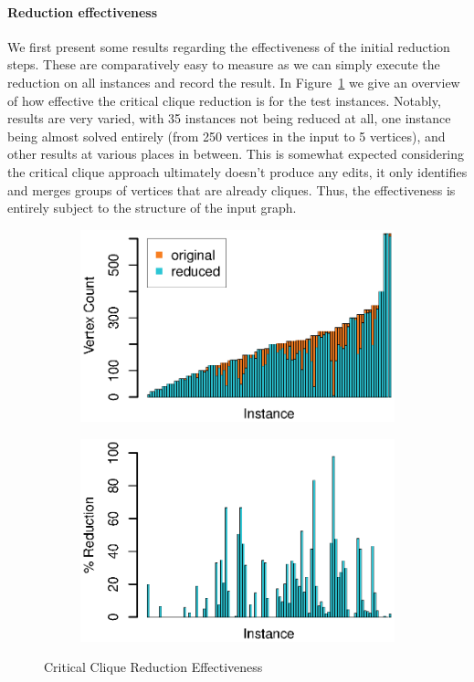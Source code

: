 \documentclass[12pt,oneside,english,parskip=full,headings=small]{scrbook}
\theoremstyle{definition}
\begin{document}
\paragraph{Reduction effectiveness} We first present some results regarding the effectiveness of the
initial reduction steps. These are comparatively easy to measure as we can simply execute the
reduction on all instances and record the result. In Figure~\ref{fig:crit_clique eff} we give an
overview of how effective the critical clique reduction is for the test instances. Notably, results
are very varied, with 35 instances not being reduced at all, one instance being almost solved
entirely (from 250 vertices in the input to 5 vertices), and other results at various places in
between. This is somewhat expected considering the critical clique approach ultimately doesn't
produce any edits, it only identifies and merges groups of vertices that are already cliques. Thus,
the effectiveness is entirely subject to the structure of the input graph.

\begin{figure}[h]
	\begin{subfigure}{0.49\textwidth}
		\includegraphics[width=1.0\linewidth]{crit_cliques_absolute}
	\end{subfigure}
	\begin{subfigure}{0.49\textwidth}
		\includegraphics[width=1.0\linewidth]{crit_cliques_percent}
	\end{subfigure}
	\caption{Critical Clique Reduction Effectiveness}
	\label{fig:crit_clique eff}
\end{figure}
\end{document}
